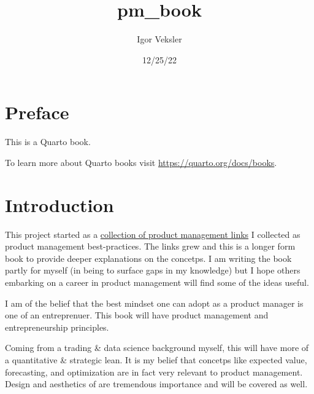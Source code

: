 \documentclass[
  letterpaper,
  DIV=11,
  numbers=noendperiod]{scrreprt}
\title{pm\_book}
\author{Igor Veksler}
\date{12/25/22}
\renewcommand*\contentsname{Table of contents}
\newcommand\contentsname{Table of contents}
\begin{document}
\maketitle
\ifdefined\Shaded\renewenvironment{Shaded}{\begin{tcolorbox}[sharp corners, borderline west={3pt}{0pt}{shadecolor}, boxrule=0pt, interior hidden, enhanced, breakable, frame hidden]}{\end{tcolorbox}}\fi

\renewcommand*\contentsname{Table of contents}
{
\hypersetup{linkcolor=}
\setcounter{tocdepth}{2}
\tableofcontents
}

\hypertarget{preface}{%
\chapter*{Preface}\label{preface}}


This is a Quarto book.

To learn more about Quarto books visit
\url{https://quarto.org/docs/books}.


\hypertarget{introduction}{%
\chapter{Introduction}\label{introduction}}

This project started as a
\href{https://github.com/iveksl2/product_management_links}{collection of
product management links} I collected as product management
best-practices. The links grew and this is a longer form book to provide
deeper explanations on the concetps. I am writing the book partly for
myself (in being to surface gaps in my knowledge) but I hope others
embarking on a career in product management will find some of the ideas
useful.

I am of the belief that the best mindset one can adopt as a product
manager is one of an entreprenuer. This book will have product
management and entrepreneurship principles.

Coming from a trading \& data science background myself, this will have
more of a quantitative \& strategic lean. It is my belief that concetps
like expected value, forecasting, and optimization are in fact very
relevant to product management. Design and aesthetics of are tremendous
importance and will be covered as well.
\end{document}
